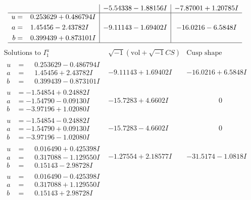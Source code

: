 \documentclass[1p]{elsarticle_modified}
\theoremstyle{definition}
\newcommand{\I}{\sqrt{-1}}
\begin{document}
$$\begin{array}{c|c|c}
 & -5.54338 - 1.88156 I & -7.87001 + 1.20785 I \\ \hline\begin{aligned}
u &= \phantom{-}0.253629 + 0.486794 I \\
a &= \phantom{-}1.45456 - 2.43782 I \\
b &= \phantom{-}0.399439 + 0.873101 I\end{aligned}
 & -9.11143 - 1.69402 I & -16.0216 - 6.5848 I\\
 \hline 
 \end{array}$$\newpage$$\begin{array}{c|c|c}  
\text{Solutions to }I^u_{1}& \I (\text{vol} + \sqrt{-1}CS) & \text{Cusp shape}\\
 \hline 
\begin{aligned}
u &= \phantom{-}0.253629 - 0.486794 I \\
a &= \phantom{-}1.45456 + 2.43782 I \\
b &= \phantom{-}0.399439 - 0.873101 I\end{aligned}
 & -9.11143 + 1.69402 I & -16.0216 + 6.5848 I \\ \hline\begin{aligned}
u &= -1.54854 + 0.24882 I \\
a &= -1.54790 - 0.09130 I \\
b &= -3.97196 + 1.02080 I\end{aligned}
 & -15.7283 + 4.6602 I & \phantom{-0.000000 } 0 \\ \hline\begin{aligned}
u &= -1.54854 - 0.24882 I \\
a &= -1.54790 + 0.09130 I \\
b &= -3.97196 - 1.02080 I\end{aligned}
 & -15.7283 - 4.6602 I & \phantom{-0.000000 } 0 \\ \hline\begin{aligned}
u &= \phantom{-}0.016490 + 0.425398 I \\
a &= \phantom{-}0.317088 - 1.129550 I \\
b &= \phantom{-}0.15143 - 2.98728 I\end{aligned}
 & -1.27554 + 2.18577 I & -31.5174 - 1.0818 I \\ \hline\begin{aligned}
u &= \phantom{-}0.016490 - 0.425398 I \\
a &= \phantom{-}0.317088 + 1.129550 I \\
b &= \phantom{-}0.15143 + 2.98728 I\end{aligned}

\end{array}$$
\end{document}
